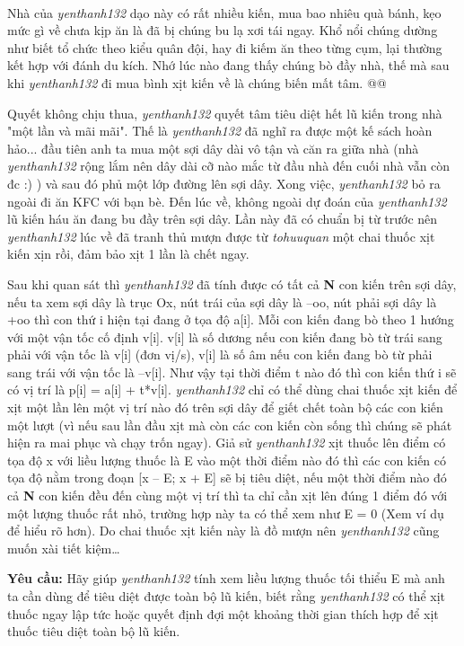 

 

Nhà của \emph{ yenthanh132 } dạo này có rất nhiều kiến, mua bao nhiêu quà bánh, kẹo mức gì về chưa kịp ăn là đã bị chúng bu lạ xơi tái ngay. Khổ nổi chúng dường như biết tổ chức theo kiểu quân đội, hay đi kiếm ăn theo từng cụm, lại thường kết hợp với đánh du kích. Nhớ lúc nào đang thấy chúng bò đầy nhà, thế mà sau khi \emph{ yenthanh132 } đi mua bình xịt kiến về là chúng biến mất tâm. @@

Quyết không chịu thua, \emph{ yenthanh132 } quyết tâm tiêu diệt hết lũ kiến trong nhà "một lần và mãi mãi". Thế là \emph{ yenthanh132 } đã nghĩ ra được một kế sách hoàn hảo... đầu tiên anh ta mua một sợi dây dài vô tận và căn ra giữa nhà (nhà \emph{ yenthanh132 } rộng lắm nên dây dài cỡ nào mắc từ đầu nhà đến cuối nhà vẫn còn đc :) ) và sau đó phủ một lớp đường lên sợi dây. Xong việc, \emph{ yenthanh132 } bỏ ra ngoài đi ăn KFC với bạn bè. Đến lúc về, không ngoài dự đoán của \emph{ yenthanh132 } lũ kiến háu ăn đang bu đầy trên sợi dây. Lần này đã có chuẩn bị từ trước nên \emph{ yenthanh132 } lúc về đã tranh thủ mượn được từ \emph{ tohuuquan } một chai thuốc xịt kiến xịn rồi, đảm bảo xịt 1 lần là chết ngay.

Sau khi quan sát thì \emph{ yenthanh132 } đã tính được có tất cả \textbf{ N } con kiến trên sợi dây, nếu ta xem sợi dây là trục Ox, nút trái của sợi dây là –oo, nút phải sợi dây là +oo thì con thứ i hiện tại đang ở tọa độ a[i]. Mỗi con kiến đang bò theo 1 hướng với một vận tốc cố định v[i]. v[i] là số dương nếu con kiến đang bò từ trái sang phải với vận tốc là v[i] (đơn vị/s), v[i] là số âm nếu con kiến đang bò từ phải sang trái với vận tốc là –v[i]. Như vậy tại thời điểm t nào đó thì con kiến thứ i sẽ có vị trí là p[i] = a[i] + t*v[i]. \emph{ yenthanh132 } chỉ có thể dùng chai thuốc xịt kiến để xịt một lần lên một vị trí nào đó trên sợi dây để giết chết toàn bộ các con kiến một lượt (vì nếu sau lần đầu xịt mà còn các con kiến còn sống thì chúng sẽ phát hiện ra mai phục và chạy trốn ngay). Giả sử \emph{ yenthanh132 } xịt thuốc lên điểm có tọa độ x với liều lượng thuốc là E vào một thời điểm nào đó thì các con kiến có tọa độ nằm trong đoạn [x – E; x + E] sẽ bị tiêu diệt, nếu một thời điểm nào đó cả \textbf{ N } con kiến đều đến cùng một vị trí thì ta chỉ cần xịt lên đúng 1 điểm đó với một lượng thuốc rất nhỏ, trường hợp này ta có thể xem như E = 0 (Xem ví dụ để hiểu rõ hơn). Do chai thuốc xịt kiến này là đồ mượn nên \emph{ yenthanh132 } cũng muốn xài tiết kiệm…

\textbf{Yêu cầu: } Hãy giúp \emph{ yenthanh132 } tính xem liều lượng thuốc tối thiểu E mà anh ta cần dùng để tiêu diệt được toàn bộ lũ kiến, biết rằng \emph{ yenthanh132 } có thể xịt thuốc ngay lập tức hoặc quyết định đợi một khoảng thời gian thích hợp để xịt thuốc tiêu diệt toàn bộ lũ kiến.

